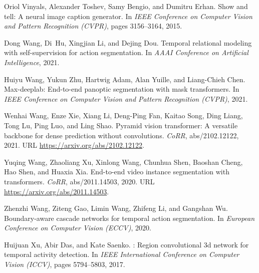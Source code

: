 \documentclass{bmvc2k}
\begin{document}
\begin{thebibliography}{53}
Oriol Vinyals, Alexander Toshev, Samy Bengio, and Dumitru Erhan.
\newblock Show and tell: A neural image caption generator.
\newblock In \emph{{IEEE} Conference on Computer Vision and Pattern Recognition
  (CVPR)}, pages 3156--3164, 2015.

Dong Wang, Di~Hu, Xingjian Li, and Dejing Dou.
\newblock Temporal relational modeling with self-supervision for action
  segmentation.
\newblock In \emph{AAAI Conference on Artificial Intelligence},
  2021{}.

Huiyu Wang, Yukun Zhu, Hartwig Adam, Alan Yuille, and Liang-Chieh Chen.
\newblock Max-deeplab: End-to-end panoptic segmentation with mask transformers.
\newblock In \emph{IEEE Conference on Computer Vision and Pattern Recognition
  (CVPR)}, 2021{}.

Wenhai Wang, Enze Xie, Xiang Li, Deng{-}Ping Fan, Kaitao Song, Ding Liang, Tong
  Lu, Ping Luo, and Ling Shao.
\newblock Pyramid vision transformer: {A} versatile backbone for dense
  prediction without convolutions.
\newblock \emph{CoRR}, abs/2102.12122, 2021{}.
\newblock URL \url{https://arxiv.org/abs/2102.12122}.

Yuqing Wang, Zhaoliang Xu, Xinlong Wang, Chunhua Shen, Baoshan Cheng, Hao Shen,
  and Huaxia Xia.
\newblock End-to-end video instance segmentation with transformers.
\newblock \emph{CoRR}, abs/2011.14503, 2020{}.
\newblock URL \url{https://arxiv.org/abs/2011.14503}.

Zhenzhi Wang, Ziteng Gao, Limin Wang, Zhifeng Li, and Gangshan Wu.
\newblock Boundary-aware cascade networks for temporal action segmentation.
\newblock In \emph{European Conference on Computer Vision (ECCV)},
  2020{}.

Huijuan Xu, Abir Das, and Kate Saenko.
: Region convolutional 3d network for temporal activity
  detection.
\newblock In \emph{{IEEE} International Conference on Computer Vision (ICCV)},
  pages 5794--5803, 2017.


\end{thebibliography}
\end{document}
